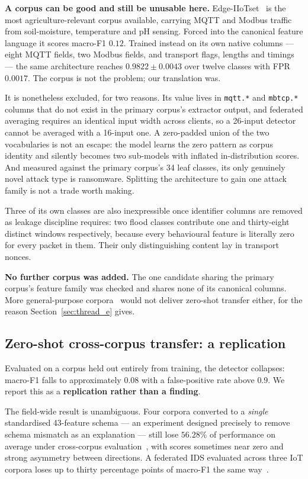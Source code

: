 \documentclass[conference]{IEEEtran}
\begin{document}
\textbf{A corpus can be good and still be unusable here.} Edge-IIoTset~\cite{ferrag2022edgeiiotset}
is the most agriculture-relevant corpus available, carrying MQTT and Modbus traffic from
soil-moisture, temperature and pH sensing. Forced into the canonical feature language it scores
macro-F1 $0.12$. Trained instead on its own native columns --- eight MQTT fields, two Modbus
fields, and transport flags, lengths and timings --- the same architecture reaches
$\mathbf{0.9822 \pm 0.0043}$ over twelve classes with FPR $0.0017$. The corpus is not the problem;
our translation was.

It is nonetheless excluded, for two reasons. Its value lives in \texttt{mqtt.*} and
\texttt{mbtcp.*} columns that do not exist in the primary corpus's extractor output, and federated
averaging requires an identical input width across clients, so a 26-input detector cannot be
averaged with a 16-input one. A zero-padded union of the two vocabularies is not an escape: the
model learns the zero pattern as corpus identity and silently becomes two sub-models with inflated
in-distribution scores. And measured against the primary corpus's 34 leaf classes, its only
genuinely novel attack type is ransomware. Splitting the architecture to gain one attack family is
not a trade worth making.

Three of its own classes are also inexpressible once identifier columns are removed as leakage
discipline requires: two flood classes contribute one and thirty-eight distinct windows
respectively, because every behavioural feature is literally zero for every packet in them. Their
only distinguishing content lay in transport nonces.

\textbf{No further corpus was added.} The one candidate sharing the primary corpus's feature
family was checked and shares none of its canonical columns. More general-purpose
corpora~\cite{herzalla2023tiissrc} would not deliver zero-shot transfer either, for the reason
Section~\ref{sec:thread_e} gives.

\subsection{Zero-shot cross-corpus transfer: a replication}
Evaluated on a corpus held out entirely from training, the detector collapses: macro-F1
falls to approximately $0.08$ with a false-positive rate above $0.9$. We report this as a
\textbf{replication rather than a finding}.

The field-wide result is unambiguous. Four corpora converted to a \emph{single} standardised
43-feature schema --- an experiment designed precisely to remove schema mismatch as an explanation
--- still lose $56.28\%$ of performance on average under cross-corpus
evaluation~\cite{layeghy2022generalisability}, with scores sometimes near zero and strong asymmetry
between directions. A federated IDS evaluated across three IoT corpora loses up to thirty
percentage points of macro-F1 the same way~\cite{dataset_centric_fl_ids}.
\end{document}
